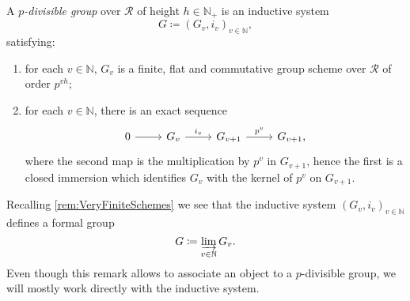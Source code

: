 \begin{defn}\label{defn:pDivGroupFormalSchemes}
	A \emph{$p$-divisible group} over $\mathscr{R}$ of height $h \in \mathbb{N}_+$ is an inductive system
	\begin{equation*}
	G \coloneqq \left(G_v, i_v\right)_{v \in \mathbb{N}}
	,\end{equation*} 
	satisfying:
	\begin{enumerate}
		\item for each $v \in \mathbb{N}$, $G_v$ is a finite, flat
			and commutative group scheme over $\mathscr{R}$
			of order $p^{v h}$;
		\item for each $v \in \mathbb{N}$, there is an exact sequence
			\begin{equation*}
			\begin{tikzcd}
				0 \arrow[r, "", rightarrow] &
				G_v \arrow[r, "i_v", rightarrow] &
				G_{v + 1} \arrow[r, "p^v", rightarrow] &
				G_{v + 1} 
			,\end{tikzcd}
			\end{equation*}
			where the second map is the multiplication by $p^v$ in $G_{v + 1}$,
			hence the first is a closed immersion which identifies
			$G_v$ with the kernel of $p^v$ on $G_{v+1}$.
	\end{enumerate}
\end{defn}


\begin{rem}[]
	Recalling \cref{rem:VeryFiniteSchemes} we see that the inductive system 
	$\left( G_v, i_v \right)_{v \in \mathbb{N}}$ defines a formal group 
	\begin{equation*}
	G \coloneqq \varinjlim_{v \in \mathbb{N}} G_v
	.\end{equation*}
	Even though this remark allows to associate an object to a $p$-divisible 
	group, we will mostly work directly with the inductive system.
\end{rem}


